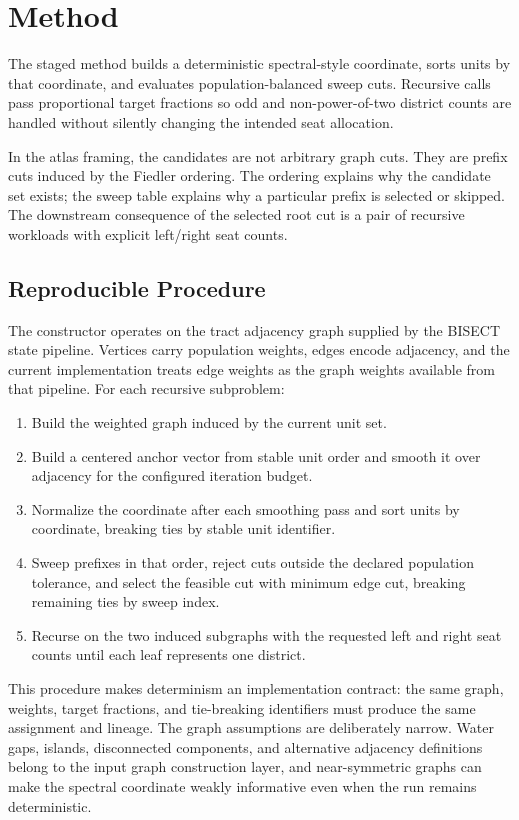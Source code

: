 \section{Method}

The staged method builds a deterministic spectral-style coordinate, sorts units
by that coordinate, and evaluates population-balanced sweep cuts. Recursive calls pass
proportional target fractions so odd and non-power-of-two district counts are
handled without silently changing the intended seat allocation.

In the atlas framing, the candidates are not arbitrary graph cuts. They are
prefix cuts induced by the Fiedler ordering. The ordering explains why the
candidate set exists; the sweep table explains why a particular prefix is
selected or skipped. The downstream consequence of the selected root cut is a
pair of recursive workloads with explicit left/right seat counts.

\subsection{Reproducible Procedure}

The constructor operates on the tract adjacency graph supplied by the BISECT
state pipeline. Vertices carry population weights, edges encode adjacency, and
the current implementation treats edge weights as the graph weights available
from that pipeline. For each recursive subproblem:

\begin{enumerate}
  \item Build the weighted graph induced by the current unit set.
  \item Build a centered anchor vector from stable unit order and smooth it
        over adjacency for the configured iteration budget.
  \item Normalize the coordinate after each smoothing pass and sort units by
        coordinate, breaking ties by stable unit identifier.
  \item Sweep prefixes in that order, reject cuts outside the declared
        population tolerance, and select the feasible cut with minimum edge cut,
        breaking remaining ties by sweep index.
  \item Recurse on the two induced subgraphs with the requested left and right
        seat counts until each leaf represents one district.
\end{enumerate}

This procedure makes determinism an implementation contract: the same graph,
weights, target fractions, and tie-breaking identifiers must produce the same
assignment and lineage. The graph assumptions are deliberately narrow. Water
gaps, islands, disconnected components, and alternative adjacency definitions
belong to the input graph construction layer, and near-symmetric graphs can
make the spectral coordinate weakly informative even when the run remains
deterministic.

